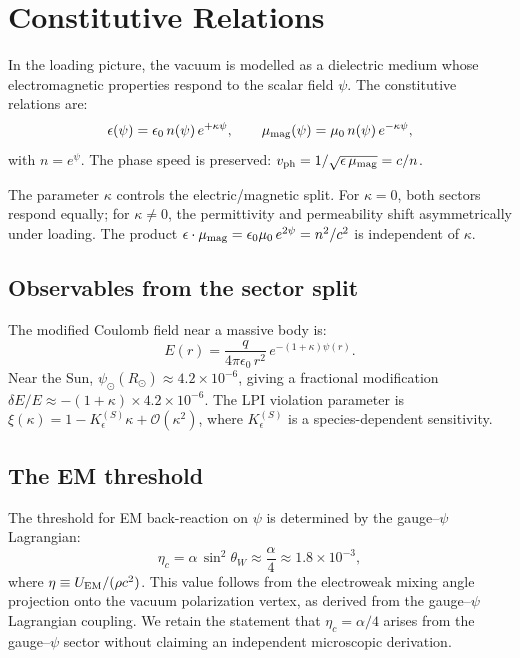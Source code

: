 \documentclass[aps,prd,twocolumn,superscriptaddress,nofootinbib]{revtex4-2}
\begin{document}
\section{Constitutive Relations}
\label{sec:constitutive}

In the loading picture, the vacuum is modelled as a dielectric medium
whose electromagnetic properties respond to the scalar field $\psi$.
The constitutive relations are:
\begin{equation}
\epsilon(\psi) = \epsilon_0\, n(\psi)\, e^{+\kappa\psi}, \qquad
\mu_{\rm mag}(\psi) = \mu_0\, n(\psi)\, e^{-\kappa\psi},
\label{eq:constitutive}
\end{equation}
with $n = e^\psi$.  The phase speed is preserved:
$v_{\rm ph} = 1/\sqrt{\epsilon\,\mu_{\rm mag}} = c/n$.

The parameter $\kappa$ controls the electric/magnetic split.  For
$\kappa = 0$, both sectors respond equally; for $\kappa \neq 0$, the
permittivity and permeability shift asymmetrically under loading.
The product $\epsilon\cdot\mu_{\rm mag} = \epsilon_0\mu_0\, e^{2\psi}
= n^2/c^2$ is independent of $\kappa$.

\subsection{Observables from the sector split}

The modified Coulomb field near a massive body is:
\begin{equation}
E(r) = \frac{q}{4\pi\epsilon_0\, r^2}\, e^{-(1+\kappa)\psi(r)}.
\label{eq:coulomb-modified}
\end{equation}
Near the Sun, $\psi_\odot(R_\odot) \approx 4.2\times 10^{-6}$, giving
a fractional modification $\delta E/E \approx -(1+\kappa)\times
4.2\times 10^{-6}$.  The LPI violation parameter is
$\xi(\kappa) = 1 - K_\epsilon^{(S)}\kappa + \mathcal{O}(\kappa^2)$,
where $K_\epsilon^{(S)}$ is a species-dependent sensitivity.

\subsection{The EM threshold}

The threshold for EM back-reaction on $\psi$ is determined by the
gauge--$\psi$ Lagrangian:
\begin{equation}
\eta_c = \alpha\,\sin^2\theta_W \approx \frac{\alpha}{4}
\approx 1.8\times 10^{-3},
\label{eq:eta-threshold}
\end{equation}
where $\eta \equiv U_{\rm EM}/(\rho c^2)$.  This value follows from
the electroweak mixing angle projection onto the vacuum polarization
vertex, as derived from the gauge--$\psi$ Lagrangian coupling.  We
retain the statement that $\eta_c = \alpha/4$ arises from the
gauge--$\psi$ sector without claiming an independent microscopic
derivation.
\end{document}
